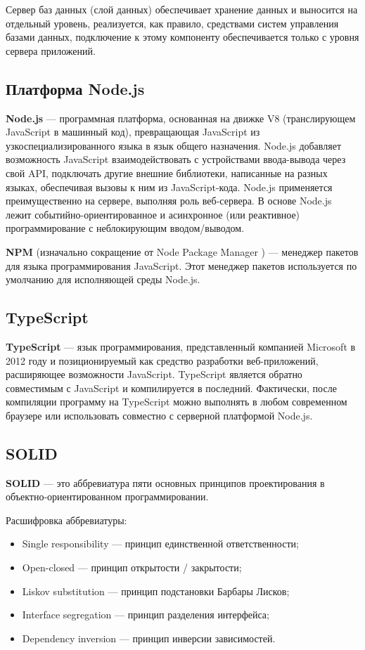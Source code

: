 \documentclass[specification,annotation,times]{itmo-student-thesis}
\begin{document}
Сервер баз данных (слой данных) обеспечивает хранение данных и выносится на отдельный уровень, реализуется, как правило, средствами систем управления базами данных, подключение к этому компоненту обеспечивается только с уровня сервера приложений.

\subsection{Платформа Node.js}

\textbf{Node.js} \label{node-js}  — программная платформа, основанная на движке V8 (транслирующем JavaScript в машинный код), превращающая JavaScript из узкоспециализированного языка в язык общего назначения. Node.js добавляет возможность JavaScript взаимодействовать с устройствами ввода-вывода через свой API, подключать другие внешние библиотеки, написанные на разных языках, обеспечивая вызовы к ним из JavaScript-кода. Node.js применяется преимущественно на сервере, выполняя роль веб-сервера. В основе Node.js лежит событийно-ориентированное и асинхронное (или реактивное) программирование с неблокирующим вводом/выводом.

\textbf{NPM} (изначально сокращение от Node Package Manager ) \label{NPM} — менеджер пакетов для языка программирования JavaScript. Этот менеджер пакетов используется по умолчанию для исполняющей среды Node.js.

\subsection{TypeScript}

\textbf{TypeScript} \label{typescript}  — язык программирования, представленный компанией Microsoft в 2012 году и позиционируемый как средство разработки веб-приложений, расширяющее возможности JavaScript. TypeScript является обратно совместимым с JavaScript и компилируется в последний. Фактически, после компиляции программу на TypeScript можно выполнять в любом современном браузере или использовать совместно с серверной платформой Node.js.

\subsection{SOLID}

\textbf{SOLID} \label{SOLID} — это аббревиатура пяти основных принципов проектирования в объектно-ориентированном программировании.

Расшифровка аббревиатуры:
\begin{itemize}
\item Single responsibility — принцип единственной ответственности;
\item Open-closed — принцип открытости / закрытости;
\item Liskov substitution — принцип подстановки Барбары Лисков;
\item Interface segregation — принцип разделения интерфейса;
\item Dependency inversion — принцип инверсии зависимостей.
\end{itemize}
\end{document}
